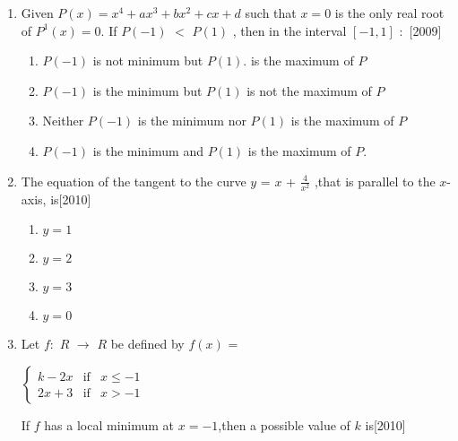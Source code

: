 \documentclass[journal,12pt,onecolumn]{IEEEtran}
\theoremstyle{remark}
\begin{document}
\begin{enumerate}
\begin{enumerate}
        \end{enumerate}        \item Given $ P(x)=x^4+ ax^3+bx^2+ cx+d$ such that $x = 0$ is the only real root of $P^1(x) = 0$. If $P(-1)$ $<$ $P(1)$ , then in the interval $[-1,1]$ $\colon$ \hfill[2009]
        
        \begin{enumerate}
        
            
        
            
        \item $P(-1)$ is not minimum but $P(1)$. is the maximum of $P$
        \item $P(-1)$ is the minimum but $P(1)$ is not the maximum of $P$
        \item  Neither $P(-1)$ is the  minimum nor  $P(1)$ is the maximum of $P$
        \item $P(-1)$ is the minimum and $P(1)$ is the maximum of $P$.
        
        \end{enumerate}
        
            
        \item The equation of the tangent to the curve $y$ = $x$ + $\frac{4}{x^2}$ ,that is parallel to the $x$-axis, is\hfill[2010]
         \begin{multicols}{4}
        \begin{enumerate}
        
            
        
            \item $y=1$
        \item $y=2$
        \item $y=3$
        \item $y=0$
        \end{enumerate}
        \end{multicols}
            
        \item Let $f$$\colon$ $R$ $\to$ $R$ be defined by $f(x)$ = 
    
 $\left\{ \begin{array}{rcl}
     k-2x & \text{if} &  x\leq -1 \\ 2x+3 & \text{if} & x>-1
     \end{array}\right.$
        
        
        If $f$ has a local minimum at $x = -1$,then a possible value of $k$ is\hfill[2010]
         \begin{multicols}{4}
        

\end{multicols}
\end{enumerate}
\end{document}
